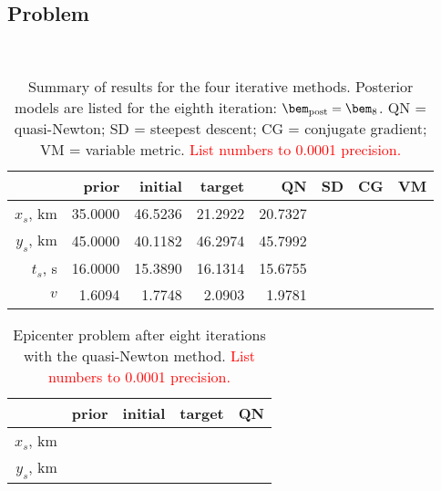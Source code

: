 \documentclass[11pt,titlepage,fleqn]{article}
\begin{document}

\subsection*{Problem} \howmuchtime\



\vspace{4cm}

\begin{table}[h]
\centering
\caption[]{
Summary of results for the four iterative methods.
Posterior models are listed for the eighth iteration: $\bem_{\rm post} = \bem_8$.
QN = quasi-Newton; SD = steepest descent; CG = conjugate gradient; VM = variable metric.
\textcolor{red}{List numbers to 0.0001 precision.}
\label{tab}
}
\begin{spacing}{1.4}
\begin{tabular}{r||r|r|r||r|r|r|r}
\hline
& prior & initial & target & QN & SD \hspace{1cm} & CG \hspace{1cm}  & VM \hspace{1cm}  \\
\hline\hline 
$x_s$, km & 35.0000 & 46.5236 & 21.2922 & 20.7327 & & \\ \hline
$y_s$, km & 45.0000 & 40.1182 & 46.2974 & 45.7992 & & \\ \hline
$t_s$, s  & 16.0000 & 15.3890 & 16.1314 & 15.6755 & & \\ \hline
$v$       &  1.6094 &  1.7748 &  2.0903 &  1.9781 & & \\ \hline
\end{tabular}
\end{spacing}
\end{table}

\begin{table}
\centering
\caption[]{
Epicenter problem after eight iterations with the quasi-Newton method.
\textcolor{red}{List numbers to 0.0001 precision.}
\label{tab:epi}
}
\begin{spacing}{1.4}
\begin{tabular}{r||r|r|r||r}
\hline
& prior & initial & target & QN \\
\hline\hline 
$x_s$, km & \hspace{2cm} & \hspace{2cm} & \hspace{2cm} & \hspace{2cm} \\ \hline
$y_s$, km & & & &  \\ \hline
\end{tabular}
\end{spacing}
\end{table}
\end{document}
